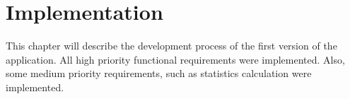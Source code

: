 
\chapter{Implementation}\label{ch:implementation}

This chapter will describe the development process of the first version of the application.
All high priority functional requirements were implemented.
Also, some medium priority requirements, such as statistics calculation were implemented.





